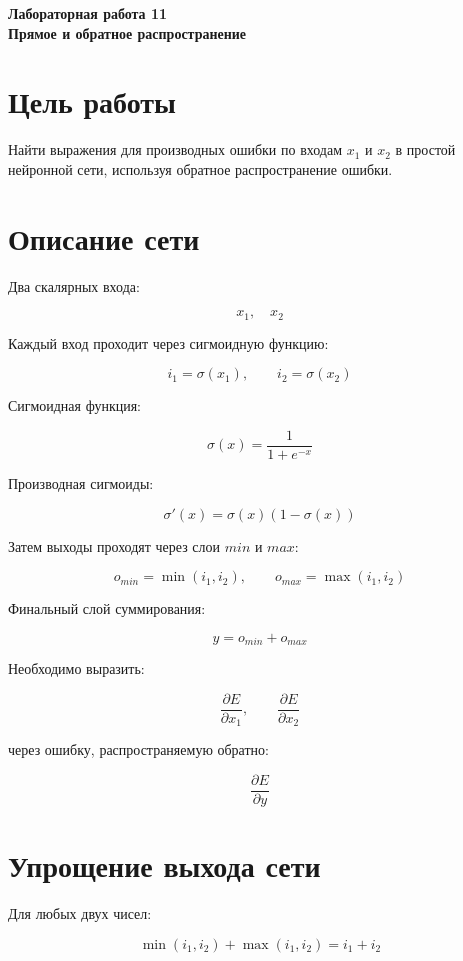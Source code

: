 \documentclass[a4paper,12pt]{article}
\begin{document}
\begin{center}
    \Large\textbf{Лабораторная работа 11}\\
    \large\textbf{Прямое и обратное распространение}\\
    \vspace{0.5cm}
\end{center}

\section*{Цель работы}

Найти выражения для производных ошибки по входам $x_1$ и $x_2$ в простой нейронной сети, используя обратное распространение ошибки.

\section*{Описание сети}

Два скалярных входа:

\[
x_1, \quad x_2
\]

Каждый вход проходит через сигмоидную функцию:

\[
i_1 = \sigma(x_1),\qquad i_2 = \sigma(x_2)
\]

Сигмоидная функция:

\[
\sigma(x) = \frac{1}{1 + e^{-x}}
\]

Производная сигмоиды:

\[
\sigma'(x) = \sigma(x)(1 - \sigma(x))
\]

Затем выходы проходят через слои $min$ и $max$:

\[
o_{min} = \min(i_1, i_2),\qquad o_{max} = \max(i_1, i_2)
\]

Финальный слой суммирования:

\[
y = o_{min} + o_{max}
\]

Необходимо выразить:

\[
\frac{\partial E}{\partial x_1},\qquad \frac{\partial E}{\partial x_2}
\]

через ошибку, распространяемую обратно:

\[
\frac{\partial E}{\partial y}
\]

\section*{Упрощение выхода сети}

Для любых двух чисел:

\[
\min(i_1, i_2) + \max(i_1, i_2) = i_1 + i_2
\]
\end{document}
